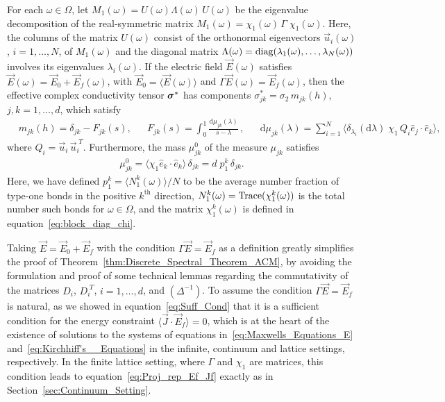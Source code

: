 \documentclass{cmslatex}
\renewcommand{\d}{\text{d}}
\newcommand\bsig{\mbox{\boldmath${\sigma}$}}
\begin{document}
\vspace{0.15in}
% 
\begin{theorem}\label{thm:Discrete_Spectral_Theorem_ACM}
  For each $\omega\in\Omega$, let $M_1(\omega)=U(\omega)\Lambda(\omega)\,U(\omega)$ be the eigenvalue
  decomposition of the real-symmetric matrix
  $M_1(\omega)=\chi_1(\omega)\,\Gamma\;\chi_1(\omega)$. Here, the columns of the matrix $U(\omega)$
  consist of the orthonormal eigenvectors $\vec{u}_i(\omega)$, $i=1,\ldots,N$,
  of $M_1(\omega)$ and the diagonal matrix $\Lambda(\omega)={\rm diag}(\lambda_1(\omega),\ldots,\lambda_N(\omega))$
  involves its eigenvalues $\lambda_i(\omega)$. If the electric field
  $\vec{E}(\omega)$ satisfies $\vec{E}(\omega)=\vec{E}_0+\vec{E}_f(\omega)$, with
  $\vec{E}_0=\langle\vec{E}(\omega)\rangle$ and $\Gamma\vec{E}(\omega)=\vec{E}_f(\omega)$, then the
  effective complex conductivity tensor $\bsig^*$ has components
  $\sigma_{jk}^*=\sigma_2\,m_{jk}(h)$, $j,k=1,\ldots,d$,  which satisfy       
%
\begin{align}\label{eq:Stieltjes_F_Discrete}
  &m_{jk}(h)=\delta_{jk}-F_{jk}(s), 
  &&F_{jk}(s)=\int_0^1\frac{\d\mu_{jk}(\lambda)}{s-\lambda}\,, 
  &&\d\mu_{jk}(\lambda)=\sum_{i=1}^N\langle \delta_{\lambda_i}(\d\lambda)\;\chi_1\,Q_i\hat{e}_j\cdot\hat{e}_k\rangle,  
\end{align}
%
where $Q_i=\vec{u}_i\,\vec{u}_i^{\;T}$. Furthermore, the mass $\mu_{jk}^0$ of the
measure $\mu_{jk}$ satisfies 
%
\begin{align}\label{eq:Measure_Mass_theorem}
  \mu_{jk}^0=\langle\chi_1\hat{e}_k\cdot\hat{e}_k\rangle\,\delta_{jk}
       =d\;p_1^k\,\delta_{jk}.
\end{align}
%
Here, we have defined $p_1^k=\langle N_1^k(\omega)\rangle/N$ to be the average number
fraction of type-one bonds in the positive $k^{\text{th}}$ direction,
$N_1^k(\omega)={\rm Trace}(\chi_1^k(\omega))$ is the total number such bonds for
$\omega\in\Omega$, and the matrix $\chi_1^k(\omega)$ is defined in
equation~\eqref{eq:block_diag_chi}.   
% 
\end{theorem}


Taking $\vec{E}=\vec{E}_0+\vec{E}_f$ with the 
condition $\Gamma\vec{E}=\vec{E}_f$ as a definition greatly simplifies the
proof of Theorem~\ref{thm:Discrete_Spectral_Theorem_ACM}, by avoiding
the formulation and proof of some technical lemmas regarding the
commutativity of the matrices $D_i$, $D_i^{\;T}$, $i=1,\ldots,d$, and
$(\Delta^{-1})$. To assume the condition $\Gamma\vec{E}=\vec{E}_f$ is natural, 
as we showed in equation~\eqref{eq:Suff_Cond} that it is a 
sufficient condition for the energy constraint
$\langle\vec{J}\cdot\vec{E}_f\rangle=0$, which is at the heart of the existence of
solutions to the systems of equations
in~\eqref{eq:Maxwells_Equations_E}
and~\eqref{eq:Kirchhiff's__Equations} 
in the infinite, continuum and lattice settings, respectively. In the
finite lattice setting, where $\Gamma$ and $\chi_1$ are matrices, this
condition leads to equation~\eqref{eq:Proj_rep_Ef_Jf} exactly as in
Section~\ref{sec:Continuum_Setting}.   
\end{document}
